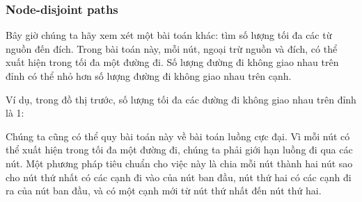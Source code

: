\subsubsection{Node-disjoint paths}

Bây giờ chúng ta hãy xem xét một bài toán khác:
tìm số lượng tối đa các
 từ nguồn
đến đích.
Trong bài toán này, mỗi nút,
ngoại trừ nguồn và đích,
có thể xuất hiện trong tối đa một đường đi.
Số lượng đường đi không giao nhau trên đỉnh
có thể nhỏ hơn số lượng
đường đi không giao nhau trên cạnh.

Ví dụ, trong đồ thị trước,
số lượng tối đa các đường đi không giao nhau trên đỉnh là 1:

\begin{center}
\end{center}

Chúng ta cũng có thể quy bài toán này về bài toán luồng cực đại.
Vì mỗi nút có thể xuất hiện trong tối đa một đường đi,
chúng ta phải giới hạn luồng đi qua các nút.
Một phương pháp tiêu chuẩn cho việc này là chia mỗi nút thành
hai nút sao cho nút thứ nhất có các cạnh đi vào
của nút ban đầu, nút thứ hai có các cạnh đi ra
của nút ban đầu, và
có một cạnh mới từ nút thứ nhất
đến nút thứ hai.

